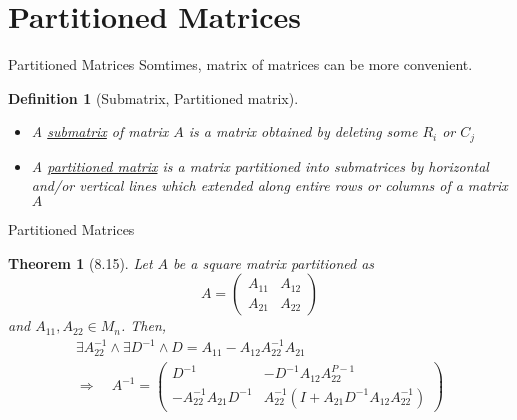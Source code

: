 \documentclass[a4paper,11pt]{article}
\newtheorem{defn}{Definition}
\newtheorem{thm}{Theorem}
\begin{document}
%

\section{Partitioned Matrices} %
\label{sec:partitioned_matrices}
\begin{frame}[t]{Partitioned Matrices}
	Somtimes, matrix of matrices can be more convenient.
	\begin{defn}
		[Submatrix, Partitioned matrix]
		\begin{itemize}
			\item A \uline{submatrix} of matrix $A$ is a matrix obtained by deleting some $R_i$ or $C_j$
			\item A \uline{partitioned matrix} is a matrix partitioned into submatrices by horizontal and/or vertical lines which extended along entire rows or columns of a matrix $A$
		\end{itemize}
	\end{defn}
\end{frame}
\begin{frame}[t]{Partitioned Matrices}
	\begin{thm}
		[8.15] Let $A$ be a square matrix partitioned as\[
			A=\begin{pmatrix}
				A_{11}&A_{12}\\
				A_{21}&A_{22}
			\end{pmatrix}
		\] and $A_{11}, A_{22}\in M_n$. Then, 
		\begin{multline*}
			\exists A_{22}^{-1}\land \exists D^{-1} \land D=A_{11}-A_{12}A_{22}^{-1}A_{21} \\\Rightarrow\quad A^{-1}=\begin{pmatrix}
				D^{-1}& -D^{-1}A_{12}A_{22}^{P-1}\\
				-A_{22}^{-1}A_{21}D^{-1}&A_{22}^{-1}(I+A_{21}D^{-1}A_{12}A_{22}^{-1})
			\end{pmatrix}
		\end{multline*}
	\end{thm}
\end{frame}

%
\end{document}
